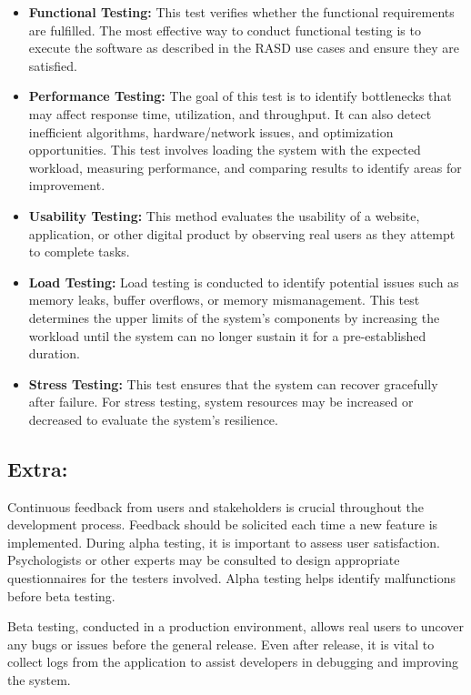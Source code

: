 \begin{itemize}
    \item \textbf{Functional Testing:} This test verifies whether the functional requirements are fulfilled. The most effective way to conduct functional testing is to execute the software as described in the RASD use cases and ensure they are satisfied.

    \item \textbf{Performance Testing:} The goal of this test is to identify bottlenecks that may affect response time, utilization, and throughput. It can also detect inefficient algorithms, hardware/network issues, and optimization opportunities. This test involves loading the system with the expected workload, measuring performance, and comparing results to identify areas for improvement.

    \item \textbf{Usability Testing:} This method evaluates the usability of a website, application, or other digital product by observing real users as they attempt to complete tasks.

    \item \textbf{Load Testing:} Load testing is conducted to identify potential issues such as memory leaks, buffer overflows, or memory mismanagement. This test determines the upper limits of the system's components by increasing the workload until the system can no longer sustain it for a pre-established duration.

    \item \textbf{Stress Testing:} This test ensures that the system can recover gracefully after failure. For stress testing, system resources may be increased or decreased to evaluate the system's resilience.
\end{itemize}

\pagebreak
\subsection{Extra:}

Continuous feedback from users and stakeholders is crucial throughout the development process. Feedback should be solicited each time a new feature is implemented. During alpha testing, it is important to assess user satisfaction. Psychologists or other experts may be consulted to design appropriate questionnaires for the testers involved. Alpha testing helps identify malfunctions before beta testing.

Beta testing, conducted in a production environment, allows real users to uncover any bugs or issues before the general release. Even after release, it is vital to collect logs from the application to assist developers in debugging and improving the system.
